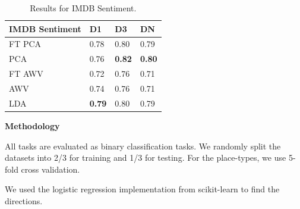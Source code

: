 \begin{table}[t]
	\centering
	\setlength{\tabcolsep}{10pt}
	\begin{tabular}{llll}
		
		\textbf{IMDB Sentiment} & D1   & D3   & DN   \\
		\toprule{}
		FT PCA         & 0.78 & 0.80 & 0.79 \\
		PCA            & 0.76 & \textbf{0.82} & \textbf{0.80} \\
		FT AWV         & 0.72 & 0.76 & 0.71 \\
		AWV            & 0.74 & 0.76 & 0.71 \\
		LDA            & \textbf{0.79} & 0.80 & 0.79 \\
		
	\end{tabular}
	\caption{Results for IMDB Sentiment. \label{tabSentiment}}
	
\end{table}

 




\noindent \textbf{Methodology} 

All tasks are evaluated as binary classification tasks. We randomly split the datasets into 2/3 for training and 1/3 for testing. For the place-types, we use 5-fold cross validation. 



We used the logistic regression implementation from scikit-learn to find the directions. 

